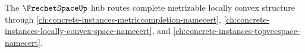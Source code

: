 The $\FrechetSpaceUp$ hub routes complete metrizable locally convex structure through \autoref{ch:concrete-instances-metriccompletion-namecert}, \autoref{ch:concrete-instances-locally-convex-space-namecert}, and \autoref{ch:concrete-instances-topvecspace-namecert}.





